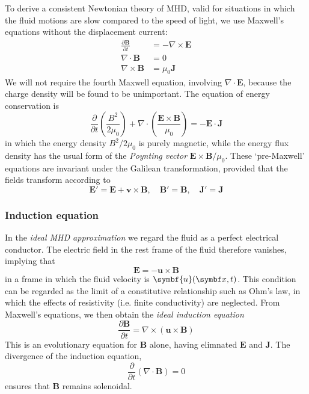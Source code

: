 \documentclass{jknotes}
\begin{document}
To derive a consistent Newtonian theory of MHD, valid for situations in which
the fluid motions are slow compared to the speed of light, we use Maxwell's
equations without the displacement current:
\begin{align}
	\frac{\partial \symbf{B}}{\partial t} &= - \nabla \times \symbf{E} \\
	\nabla \cdot \symbf{B} &= 0 \\
	\nabla \times \symbf{B} &= \mu_0 \symbf{J}
\end{align}
We will not require the fourth Maxwell equation, involving $\nabla \cdot
\symbf{E}$, because the charge density will be found to be unimportant. The
equation of energy conservation is
\begin{equation}
	\frac{\partial}{\partial t} \left( \frac{B^2}{2\mu_0}\right) + \nabla
	\cdot \left( \frac{\symbf{E}\times\symbf{B}}{\mu_0}\right) = -
	\symbf{E}\cdot\symbf{J}
\end{equation}
in which the energy density $B^2/2\mu_0$ is purely magnetic, while the energy
flux density has the usual form of the \emph{Poynting vector}
$\symbf{E}\times\symbf{B}/\mu_0$. These `pre-Maxwell' equations are invariant
under the Galilean transformation, provided that the fields transform
according to
\begin{equation}
	\symbf{E}'=\symbf{E}+\symbf{v}\times\symbf{B}, \hspace{1em}
	\symbf{B}'=\symbf{B}, \hspace{1em} \symbf{J}'=\symbf{J}
\end{equation}

\subsubsection{Induction equation}
In the \emph{ideal MHD approximation} we regard the fluid as a perfect
electrical conductor. The electric field in the rest frame of the fluid
therefore vanishes, implying that
\begin{equation}
	\symbf{E} = - \symbf{u}\times\symbf{B}
\end{equation}
in a frame in which the fluid velocity is $\symbf{u}(\x,t)$. This condition
can be regarded as the limit of a constitutive relationship such as Ohm's law,
in which the effects of resistivity (i.e. finite conductivity) are neglected.
From Maxwell's equations, we then obtain the \emph{ideal induction equation}
\begin{equation}
	\frac{\partial \symbf{B}}{\partial t} = \nabla \times (\symbf{u} \times
	\symbf{B})
\end{equation}
This is an evolutionary equation for $\symbf{B}$ alone, having elimnated
$\symbf{E}$ and $\symbf{J}$. The divergence of the induction equation,
\begin{equation}
	\frac{\partial}{\partial t} \left( \nabla \cdot \symbf{B}\right) = 0
\end{equation}
ensures that $\symbf{B}$ remains solenoidal. 
\end{document}

